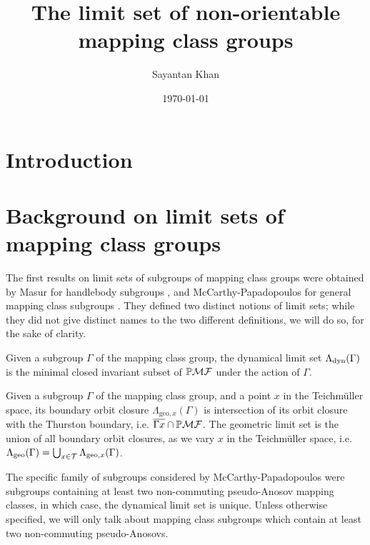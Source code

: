 \documentclass[12pt, reqno]{amsart}
\title{The limit set of non-orientable mapping class groups}
\author{Sayantan Khan}
\date{\today}
\begin{document}
\maketitle
\begin{abstract}

\end{abstract}
\tableofcontents

\section{Introduction}
\label{sec:introduction}

\section{Background on limit sets of mapping class groups}
\label{sec:backgr-limit-sets}

The first results on limit sets of subgroups of mapping class groups were obtained by Masur for handlebody subgroups \cite{masur_1986}, and McCarthy-Papadopoulos for general mapping class subgroups \cite{McCarthy1989}.
They defined two distinct notions of limit sets; while they did not give distinct names to the two different definitions, we will do so, for the sake of clarity.
\begin{definition}
  Given a subgroup $\Gamma$ of the mapping class group, the dynamical limit set $\Lambda_{\mathrm{dyn}}(\Gamma)$ is the minimal closed invariant subset of $\mathbb{P}\mathcal{MF}$ under the action of $\Gamma$.
\end{definition}
\begin{definition}
  Given a subgroup $\Gamma$ of the mapping class group, and a point $x$ in the Teichmüller space, its boundary orbit closure $\Lambda_{\mathrm{geo}, x}(\Gamma)$ is intersection of its orbit closure with the Thurston boundary, i.e. $\overline{\Gamma x} \cap \mathbb{P}\mathcal{MF}$.
  The geometric limit set is the union of all boundary orbit closures, as we vary $x$ in the Teichmüller space, i.e. $\Lambda_{\mathrm{geo}}(\Gamma) = \bigcup_{x \in \mathcal{T}} \Lambda_{\mathrm{geo}, x}(\Gamma)$.
\end{definition}

\begin{remark}
  The specific family of subgroups considered by McCarthy-Papadopoulos were subgroups containing at least two non-commuting pseudo-Anosov mapping classes, in which case, the dynamical limit set is unique.
  Unless otherwise specified, we will only talk about mapping class subgroups which contain at least two non-commuting pseudo-Anosovs.
\end{remark}
\end{document}
